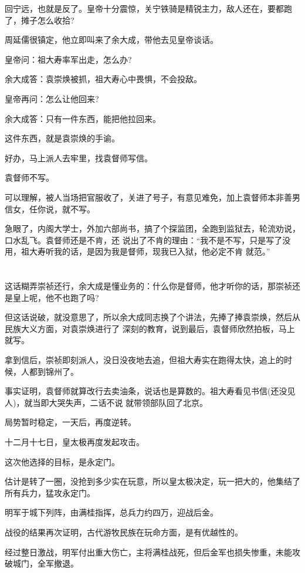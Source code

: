 \documentclass[11pt,a4paper,onecolumn]{article}
\begin{document}
回宁远，也就是反了。皇帝十分震惊，关宁铁骑是精锐主力，敌人还在，要都跑了，摊子怎么收拾?

周延儒很镇定，他立即叫来了余大成，带他去见皇帝谈话。

皇帝问：祖大寿率军出走，怎么办?

余大成答：袁崇焕被抓，祖大寿心中畏惧，不会投敌。

皇帝再问：怎么让他回来?

余大成答：只有一件东西，能把他拉回来。

这件东西，就是袁崇焕的手谕。

好办，马上派人去牢里，找袁督师写信。

袁督师不写。

可以理解，被人当场把官服收了，关进了号子，有意见难免，加上袁督师本非善男信女，任你说，就不写。

急眼了，内阁大学士，外加六部尚书，搞了个探监团，全跑到监狱去，轮流劝说，口水乱飞。袁督师还是不肯，还
说出了不肯的理由：``我不是不写，只是写了没用，祖大寿听我的话，是因为我是督师，现我已入狱，他必定不肯
就范。''

\section[\thesection]{}

这话糊弄崇祯还行，余大成是懂业务的：什么你是督师，他才听你的话，那崇祯还是皇上呢，他不也跑了吗?

但这话说破，就没意思了，所以余大成同志换了个讲法，先捧了捧袁崇焕，然后从民族大义方面，对袁崇焕进行了
深刻的教育，说到最后，袁督师欣然拍板，马上就写。

拿到信后，崇祯即刻派人，没日没夜地去追，但祖大寿实在跑得太快，追上的时候，人都到锦州了。

事实证明，袁督师就算改行去卖油条，说话也是算数的。祖大寿看见书信(还没见人)，就当即大哭失声，二话不说
就带领部队回了北京。

局势暂时稳定，一天后，再度逆转。

十二月十七日，皇太极再度发起攻击。

这次他选择的目标，是永定门。

估计是转了一圈，没抢到多少实在玩意，所以皇太极决定，玩一把大的，他集结了所有兵力，猛攻永定门。

明军于城下列阵，由满桂指挥，总兵力约四万，迎战后金。

战役的结果再次证明，古代游牧民族在玩命方面，是有优越性的。

经过整日激战，明军付出重大伤亡，主将满桂战死，但后金军也损失惨重，未能攻破城门，全军撤退。
\end{document}
